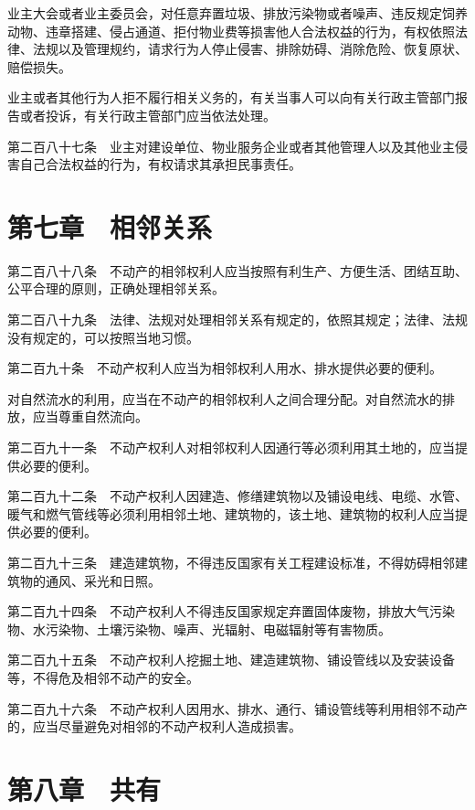 \documentclass[UTF8,12pt,a4paper]{ctexbook}
\begin{document}
业主大会或者业主委员会，对任意弃置垃圾、排放污染物或者噪声、违反规定饲养动物、违章搭建、侵占通道、拒付物业费等损害他人合法权益的行为，有权依照法律、法规以及管理规约，请求行为人停止侵害、排除妨碍、消除危险、恢复原状、赔偿损失。

业主或者其他行为人拒不履行相关义务的，有关当事人可以向有关行政主管部门报告或者投诉，有关行政主管部门应当依法处理。

第二百八十七条　业主对建设单位、物业服务企业或者其他管理人以及其他业主侵害自己合法权益的行为，有权请求其承担民事责任。

\section*{第七章　相邻关系}

第二百八十八条　不动产的相邻权利人应当按照有利生产、方便生活、团结互助、公平合理的原则，正确处理相邻关系。

第二百八十九条　法律、法规对处理相邻关系有规定的，依照其规定；法律、法规没有规定的，可以按照当地习惯。

第二百九十条　不动产权利人应当为相邻权利人用水、排水提供必要的便利。

对自然流水的利用，应当在不动产的相邻权利人之间合理分配。对自然流水的排放，应当尊重自然流向。

第二百九十一条　不动产权利人对相邻权利人因通行等必须利用其土地的，应当提供必要的便利。

第二百九十二条　不动产权利人因建造、修缮建筑物以及铺设电线、电缆、水管、暖气和燃气管线等必须利用相邻土地、建筑物的，该土地、建筑物的权利人应当提供必要的便利。

第二百九十三条　建造建筑物，不得违反国家有关工程建设标准，不得妨碍相邻建筑物的通风、采光和日照。

第二百九十四条　不动产权利人不得违反国家规定弃置固体废物，排放大气污染物、水污染物、土壤污染物、噪声、光辐射、电磁辐射等有害物质。

第二百九十五条　不动产权利人挖掘土地、建造建筑物、铺设管线以及安装设备等，不得危及相邻不动产的安全。

第二百九十六条　不动产权利人因用水、排水、通行、铺设管线等利用相邻不动产的，应当尽量避免对相邻的不动产权利人造成损害。

\section*{第八章　共有}
\end{document}
